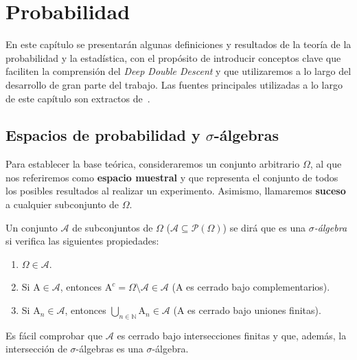 
\chapter{Probabilidad}\label{ch:capitulo-teoria-de-la-probabilidad}

En este capítulo se presentarán algunas definiciones y resultados de la teoría de la probabilidad y la estadística, con el propósito de introducir conceptos clave que faciliten la comprensión del \textit{Deep Double Descent} y que utilizaremos a lo largo del desarrollo de gran parte del trabajo. Las fuentes principales utilizadas a lo largo de este capítulo son extractos de~\cite{Dembo2014, Knill2009}.

\section{Espacios de probabilidad y $\sigma$-álgebras}

Para establecer la base teórica, consideraremos un conjunto arbitrario $\Omega$, al que nos referiremos como \textbf{espacio muestral} y que representa el conjunto de todos los posibles resultados al realizar un experimento. Asimismo, llamaremos \textbf{suceso} a cualquier subconjunto de $\Omega$.

\begin{definicion}\label{def:sigma-algebra}
    Un conjunto $\mathcal{A}$ de subconjuntos de $\Omega$ ($\mathcal{A} \subseteq \mathcal{P}(\Omega)$) se dirá que es una \emph{$\sigma$-álgebra} si verifica las siguientes propiedades:

    \begin{enumerate}
        \item $\Omega \in \mathcal{A}$.
        \item Si $\mathrm{A} \in \mathcal{A}$, entonces $\mathrm{A}^c = \Omega \setminus \mathcal{A} \in \mathcal{A}$ ($\mathrm{A}$ es cerrado bajo complementarios).
        \item Si $\mathrm{A}_{n} \in \mathcal{A}$, entonces $\bigcup_{n \in \mathbb{N}} \mathrm{A}_{n} \in \mathcal{A}$ (A es cerrado bajo uniones finitas).
    \end{enumerate}
\end{definicion}

Es fácil comprobar que $\mathcal{A}$ es cerrado bajo intersecciones finitas y que, además, la intersección de $\sigma$-álgebras es una $\sigma$-álgebra.


